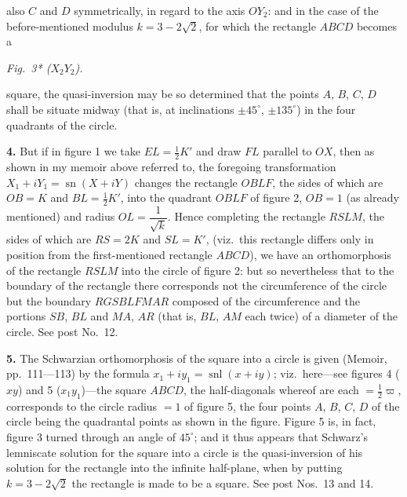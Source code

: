 \documentclass[11pt,a4paper]{article}
\providecommand{\sn}{\operatorname{sn}}
\providecommand{\snl}{\operatorname{snl}}
\begin{document}
also $C$ and $D$ symmetrically, in regard to the axis $OY_2$: and in the case of the before-mentioned modulus $k = 3 - 2\sqrt{2}$, for which the rectangle $ABCD$ becomes a
\begin{center}\textit{Fig.\ 3* (}$X_2 Y_2$\textit{).}\end{center}
square, the quasi-inversion may be so determined that the points $A$, $B$, $C$, $D$ shall be situate midway (that is, at inclinations $\pm 45^\circ$, $\pm 135^\circ$) in the four quadrants of the circle.

\textbf{4.} But if in figure 1 we take $EL = \tfrac{1}{2}K'$ and draw $FL$ parallel to $OX$, then as shown in my memoir above referred to, the foregoing transformation $X_1 + i Y_1 = \sn(X + iY)$ changes the rectangle $OBLF$, the sides of which are $OB = K$ and $BL = \tfrac{1}{2}K'$, into the quadrant $OBLF$ of figure 2, $OB = 1$ (as already mentioned) and radius $OL = \dfrac{1}{\sqrt{k}}$. Hence completing the rectangle $RSLM$, the sides of which are $RS = 2K$ and $SL = K'$, (viz.\ this rectangle differs only in position from the first-mentioned rectangle $ABCD$), we have an orthomorphosis of the rectangle $RSLM$ into the circle of figure 2: but so nevertheless that to the boundary of the rectangle there corresponds not the circumference of the circle but the boundary $RGSBLFMAR$ composed of the circumference and the portions $SB$, $BL$ and $MA$, $AR$ (that is, $BL$, $AM$ each twice) of a diameter of the circle. See post No.~12.

\textbf{5.} The Schwarzian orthomorphosis of the square into a circle is given (Memoir, pp.~111---113) by the formula $x_1 + i y_1 = \snl(x + iy)$; viz.\ here---see figures 4 ($xy$) and 5 ($x_1 y_1$)---the square $ABCD$, the half-diagonals whereof are each $= \tfrac{1}{2}\varpi$, corresponds to the circle radius $= 1$ of figure 5, the four points $A$, $B$, $C$, $D$ of the circle being the quadrantal points as shown in the figure. Figure 5 is, in fact, figure 3 turned through an angle of $45^\circ$; and it thus appears that Schwarz's lemniscate solution for the square into a circle is the quasi-inversion of his solution for the rectangle into the infinite half-plane, when by putting $k = 3 - 2\sqrt{2}$ the rectangle is made to be a square. See post Nos.~13 and 14.

\end{document}

